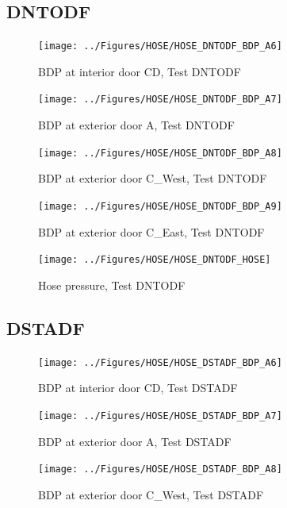 \documentclass[11pt,oneside]{book}
\begin{document}
\clearpage


\subsection{DNTODF}

\begin{figure}[!ht]
\texttt{[image: ../Figures/HOSE/HOSE\_DNTODF\_BDP\_A6]}
\caption{BDP at interior door CD, Test DNTODF}
\label{fig:HOSE_DNTODF_BDP_A6}
\end{figure}

\begin{figure}[!ht]
\texttt{[image: ../Figures/HOSE/HOSE\_DNTODF\_BDP\_A7]}
\caption{BDP at exterior door A, Test DNTODF}
\label{fig:HOSE_DNTODF_BDP_A7}
\end{figure}

\begin{figure}[!ht]
\texttt{[image: ../Figures/HOSE/HOSE\_DNTODF\_BDP\_A8]}
\caption{BDP at exterior door C\_West, Test DNTODF}
\label{fig:HOSE_DNTODF_BDP_A8}
\end{figure}

\begin{figure}[!ht]
\texttt{[image: ../Figures/HOSE/HOSE\_DNTODF\_BDP\_A9]}
\caption{BDP at exterior door C\_East, Test DNTODF}
\label{fig:HOSE_DNTODF_BDP_A9}
\end{figure}

\begin{figure}[!ht]
\texttt{[image: ../Figures/HOSE/HOSE\_DNTODF\_HOSE]}
\caption{Hose pressure, Test DNTODF}
\label{fig:HOSE_DNTODF_HOSE}
\end{figure}


\clearpage


\subsection{DSTADF}

\begin{figure}[!ht]
\texttt{[image: ../Figures/HOSE/HOSE\_DSTADF\_BDP\_A6]}
\caption{BDP at interior door CD, Test DSTADF}
\label{fig:HOSE_DSTADF_BDP_A6}
\end{figure}

\begin{figure}[!ht]
\texttt{[image: ../Figures/HOSE/HOSE\_DSTADF\_BDP\_A7]}
\caption{BDP at exterior door A, Test DSTADF}
\label{fig:HOSE_DSTADF_BDP_A7}
\end{figure}

\begin{figure}[!ht]
\texttt{[image: ../Figures/HOSE/HOSE\_DSTADF\_BDP\_A8]}
\caption{BDP at exterior door C\_West, Test DSTADF}
\label{fig:HOSE_DSTADF_BDP_A8}
\end{figure}
\end{document}
